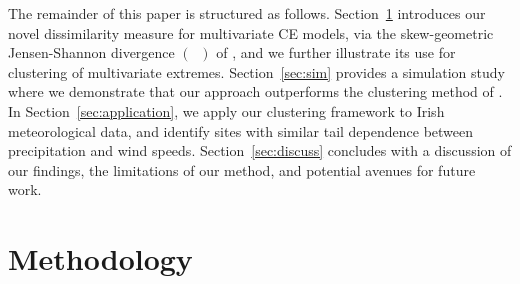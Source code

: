 \documentclass[12pt,compact]{article}
\newcommand{\JSGa}{\mathop{\mathrm{JS}^{\mathrm{G}_{\lambda}}}\nolimits}
\begin{document}
The remainder of this paper is structured as follows.
Section~\ref{sec:method} introduces our novel dissimilarity measure for multivariate CE models, via the
skew-geometric Jensen-Shannon divergence $\left(\JSGa{}\right)$ of \citet{Nielsen2019}, and we further illustrate its use for clustering of multivariate extremes. 
Section~\ref{sec:sim} provides a simulation study where we demonstrate that our approach outperforms the clustering method of \citet{Vignotto2021}.
In Section~\ref{sec:application}, we apply our clustering framework to Irish meteorological data, and identify sites with similar tail dependence between precipitation and wind speeds.
Section~\ref{sec:discuss} concludes with a discussion of our findings, the limitations of our method, and potential avenues for future work. %

\section{Methodology}
\label{sec:method}
\end{document}
